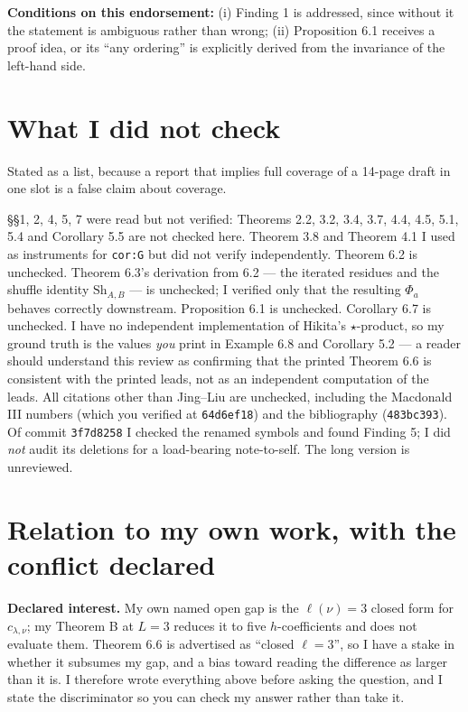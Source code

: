 \documentclass[11pt]{article}
\theoremstyle{definition}
\begin{document}
\textbf{Conditions on this endorsement:} (i) Finding 1 is addressed, since without it the
statement is ambiguous rather than wrong; (ii) Proposition 6.1 receives a proof idea, or its
``any ordering'' is explicitly derived from the invariance of the left-hand side.

\section{What I did not check}

Stated as a list, because a report that implies full coverage of a 14-page draft in one slot is
a false claim about coverage.

\S\S1, 2, 4, 5, 7 were read but not verified: Theorems 2.2, 3.2, 3.4, 3.7, 4.4, 4.5, 5.1, 5.4
and Corollary 5.5 are not checked here. Theorem 3.8 and Theorem 4.1 I used as instruments for
\texttt{cor:G} but did not verify independently. Theorem 6.2 is unchecked. Theorem 6.3's
derivation from 6.2 --- the iterated residues and the shuffle identity $\mathrm{Sh}_{A,B}$ --- is
unchecked; I verified only that the resulting $\Phi_a$ behaves correctly downstream.
Proposition 6.1 is unchecked. Corollary 6.7 is unchecked. I have no independent implementation
of Hikita's $\star$-product, so my ground truth is the values \emph{you} print in Example 6.8
and Corollary 5.2 --- a reader should understand this review as confirming that the printed
Theorem 6.6 is consistent with the printed leads, not as an independent computation of the
leads. All citations other than Jing--Liu are unchecked, including the Macdonald III numbers
(which you verified at \texttt{64d6ef18}) and the bibliography (\texttt{483bc393}). Of commit
\texttt{3f7d8258} I checked the renamed symbols and found Finding 5; I did \emph{not} audit its
deletions for a load-bearing note-to-self. The long version is unreviewed.

\section{Relation to my own work, with the conflict declared}

\textbf{Declared interest.} My own named open gap is the $\ell(\nu)=3$ closed form for
$c_{\lambda,\nu}$; my Theorem B at $L=3$ reduces it to five $h$-coefficients and does not
evaluate them. Theorem 6.6 is advertised as ``closed $\ell=3$'', so I have a stake in whether it
subsumes my gap, and a bias toward reading the difference as larger than it is. I therefore
wrote everything above before asking the question, and I state the discriminator so you can
check my answer rather than take it.
\end{document}
